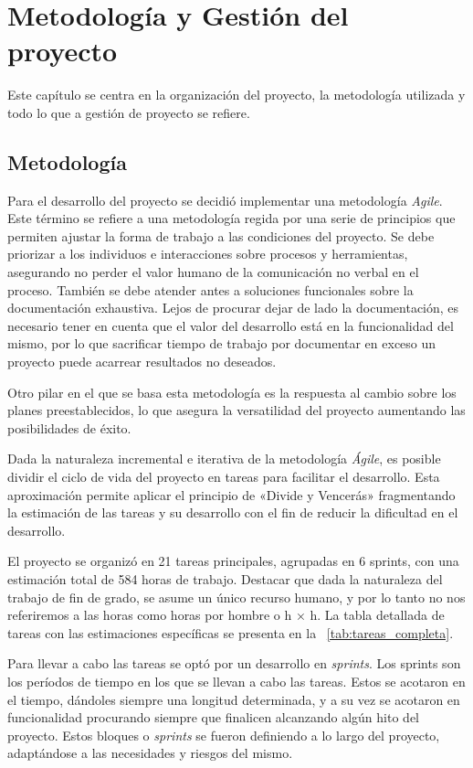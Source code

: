 \chapter{Metodología y Gestión del proyecto}
\label{chap:mygp}
Este capítulo se centra en la organización del proyecto, la metodología utilizada y todo lo que a gestión de proyecto se refiere.
\section{Metodología}
Para el desarrollo del proyecto se decidió implementar una metodología \textit{Agile}. Este término se refiere a una metodología regida por una serie de principios que permiten ajustar la forma de trabajo a las condiciones del proyecto. Se debe priorizar a los individuos e interacciones sobre procesos y herramientas, asegurando no perder el valor humano de la comunicación no verbal en el proceso. También se debe atender antes a soluciones funcionales sobre la documentación exhaustiva. Lejos de procurar dejar de lado la documentación, es necesario tener en cuenta que el valor del desarrollo está en la funcionalidad del mismo, por lo que sacrificar tiempo de trabajo por documentar en exceso un proyecto puede acarrear resultados no deseados.

Otro pilar en el que se basa esta metodología es la respuesta al cambio sobre los planes preestablecidos, lo que asegura la versatilidad del proyecto aumentando las posibilidades de éxito.

Dada la naturaleza incremental e iterativa de la metodología \textit{Ágile}, es posible dividir el ciclo de vida del proyecto en tareas para facilitar el desarrollo. Esta aproximación permite aplicar el principio de «Divide y Vencerás» fragmentando la estimación de las tareas y su desarrollo con el fin de reducir la dificultad en el desarrollo. 

El proyecto se organizó en 21 tareas principales, agrupadas en 6 sprints, con una estimación total de 584 horas de trabajo. Destacar que dada la naturaleza del trabajo de fin de grado, se asume un único recurso humano, y por lo tanto no nos referiremos a las horas como horas por hombre o h × h. La tabla detallada de tareas con las estimaciones específicas se presenta en la \tablename~\ref{tab:tareas_completa}.

Para llevar a cabo las tareas se optó por un desarrollo en \textit{sprints}. Los sprints son los períodos de tiempo en los que se llevan a cabo las tareas. Estos se acotaron en el tiempo, dándoles siempre una longitud determinada, y a su vez se acotaron en funcionalidad procurando siempre que finalicen alcanzando algún hito del proyecto. Estos bloques o \textit{sprints} se fueron definiendo a lo largo del proyecto, adaptándose a las necesidades y riesgos del mismo.

